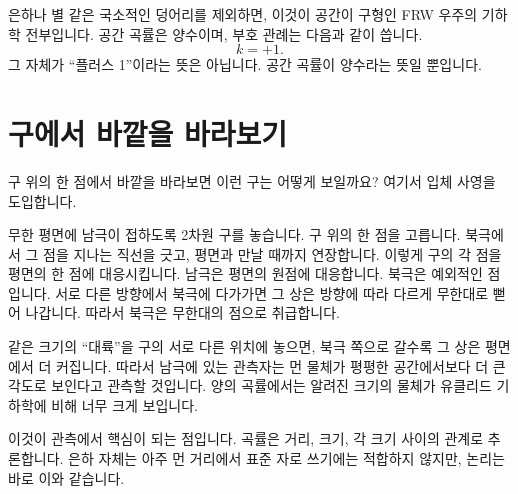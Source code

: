 은하나 별 같은 국소적인 덩어리를 제외하면, 이것이 공간이 구형인 FRW 우주의 기하학 전부입니다. 공간 곡률은 양수이며, 부호 관례는 다음과 같이 씁니다.
\begin{equation}
k=+1.
\end{equation}
그 자체가 ``플러스 1''이라는 뜻은 아닙니다. 공간 곡률이 양수라는 뜻일 뿐입니다.

\section{구에서 바깥을 바라보기}

구 위의 한 점에서 바깥을 바라보면 이런 구는 어떻게 보일까요? 여기서 입체 사영을 도입합니다.

무한 평면에 남극이 접하도록 2차원 구를 놓습니다. 구 위의 한 점을 고릅니다. 북극에서 그 점을 지나는 직선을 긋고, 평면과 만날 때까지 연장합니다. 이렇게 구의 각 점을 평면의 한 점에 대응시킵니다. 남극은 평면의 원점에 대응합니다. 북극은 예외적인 점입니다. 서로 다른 방향에서 북극에 다가가면 그 상은 방향에 따라 다르게 무한대로 뻗어 나갑니다. 따라서 북극은 무한대의 점으로 취급합니다.

같은 크기의 ``대륙''을 구의 서로 다른 위치에 놓으면, 북극 쪽으로 갈수록 그 상은 평면에서 더 커집니다. 따라서 남극에 있는 관측자는 먼 물체가 평평한 공간에서보다 더 큰 각도로 보인다고 관측할 것입니다. 양의 곡률에서는 알려진 크기의 물체가 유클리드 기하학에 비해 너무 크게 보입니다.

이것이 관측에서 핵심이 되는 점입니다. 곡률은 거리, 크기, 각 크기 사이의 관계로 추론합니다. 은하 자체는 아주 먼 거리에서 표준 자로 쓰기에는 적합하지 않지만, 논리는 바로 이와 같습니다.

\begin{classroomqa}
\end{classroomqa}

\begin{classroomqa}
\end{classroomqa}

\begin{classroomqa}
\end{classroomqa}

